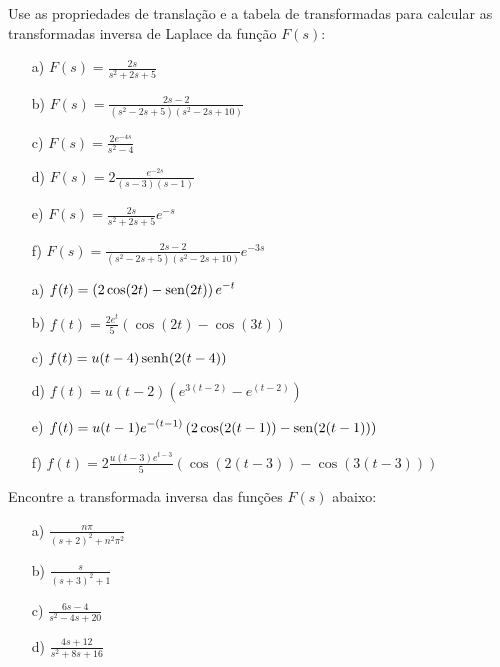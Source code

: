  \begin{Exercise}Use as propriedades de translação e a tabela de transformadas para calcular as transformadas inversa de Laplace da função $F(s)$:
 \begin{itemize}
  \item[a)] $\displaystyle F(s)=\frac{2s}{s^2+2s+5}$
    \item[b)] $\displaystyle F(s)=\frac{2s-2}{(s^2-2s+5)(s^2-2s+10)}$
  \item[c)] $\displaystyle F(s)=\frac{2e^{-4s}}{s^2-4}$
    \item[d)] $\displaystyle F(s)=2\frac{e^{-2s}}{(s-3)(s-1)}$
    
    \item[e)] $\displaystyle F(s)=\frac{2s}{s^2+2s+5}e^{-s}$
    \item[f)] $\displaystyle F(s)=\frac{2s-2}{(s^2-2s+5)(s^2-2s+10)}e^{-3s}$

 \end{itemize}
\end{Exercise}
\begin{Answer}
\begin{itemize}
  \item[a)] $\displaystyle f(t)=\left(2\cos(2t)-\operatorname{sen}(2t)\right)e^{-t}$ 
      \item[b)] $\displaystyle f(t)=\frac{2e^{t}}{5}\left(\cos(2t)-\cos(3t)\right)$ 
        \item[c)] $\displaystyle f(t)=u(t-4)\operatorname{senh}(2(t-4))$ 
      \item[d)] $\displaystyle f(t)=u(t-2)\left(e^{3(t-2)}-e^{(t-2)}\right)$ 

        \item[e)] $\displaystyle f(t)=u(t-1)e^{-(t-1)}\left(2\cos(2(t-1))-\operatorname{sen}(2(t-1))\right)$ 
      \item[f)] $\displaystyle f(t)=2\frac{u(t-3)e^{t-3}}{5}\left(\cos(2(t-3))-\cos(3(t-3))\right)$ 

 \end{itemize}

\end{Answer}
 
 \begin{Exercise}
Encontre a transformada inversa das funções $F(s)$ abaixo:
\begin{itemize}
  \item[a)] $\displaystyle \frac{n\pi}{(s+2)^2 + n^2\pi^2}$
  \item[b)] $\displaystyle \frac{s}{(s+3)^2+1}$
  \item[c)] $\displaystyle \frac{6s-4}{s^2 - 4s +20}$
  \item[d)] $\displaystyle \frac{4s + 12}{s^2 + 8s + 16}$
\end{itemize}
\end{Exercise}

